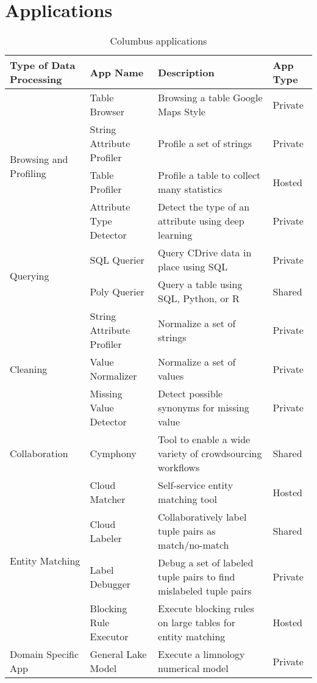 \section{Applications}

\begin{table*}[t]
  \centering
  \begin{tabular}{|p{4cm}|p{3cm}|p{7cm}|p{15mm}|}
    \hline
    Type of Data Processing & App Name & Description & App Type \\
    \hline
    \multirow{4}{*}{Browsing and Profiling} & Table Browser & Browsing a table Google Maps Style & Private \\
    \cline{2-4} & String Attribute Profiler & Profile a set of strings & Private \\
    \cline{2-4} & Table Profiler & Profile a table to collect many statistics & Hosted \\
    \cline{2-4} & Attribute Type Detector & Detect the type of an attribute using deep learning & Private \\
    \hline
    \multirow{2}{*}{Querying} & SQL Querier  & Query CDrive data in place using SQL  & Private \\
    \cline{2-4} & Poly Querier & Query a table using SQL, Python, or R & Shared \\
    \hline
    \multirow{3}{*}{Cleaning} & String Attribute Profiler & Normalize a set of strings & Private \\
    \cline{2-4} & Value Normalizer & Normalize a set of values & Private \\
    \cline{2-4} & Missing Value Detector & Detect possible synonyms for missing value & Private \\
    \hline
    Collaboration & Cymphony & Tool to enable a wide variety of crowdsourcing workflows & Shared \\
    \hline
    \multirow{4}{*}{Entity Matching} & Cloud Matcher & Self-service entity matching tool & Hosted \\
    \cline{2-4} & Cloud Labeler & Collaboratively label tuple pairs as match/no-match & Shared \\
    \cline{2-4} & Label Debugger & Debug a set of labeled tuple pairs to find mislabeled tuple pairs & Private \\
    \cline{2-4} & Blocking Rule Executor & Execute blocking rules on large tables for entity matching & Hosted \\
    \hline
    Domain Specific App & General Lake Model & Execute a limnology numerical model & Private \\ 
    \hline
  \end{tabular}
  \caption{Columbus applications}
  \label{table:1}
\end{table*}

